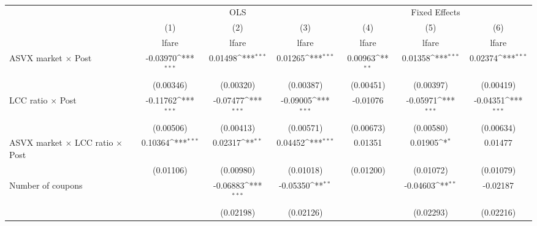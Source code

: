 \begin{table}[htbp]\centering
\def\sym#1{\ifmmode^{#1}\else\(^{#1}\)\fi}
\caption{ \label{post4fare}}
\begin{tabular}{l*{6}{c}}
\toprule
                    &\multicolumn{3}{c}{OLS}                                          &\multicolumn{3}{c}{Fixed Effects}                                \\\cmidrule(lr){2-4}\cmidrule(lr){5-7}
                    &\multicolumn{1}{c}{(1)}&\multicolumn{1}{c}{(2)}&\multicolumn{1}{c}{(3)}&\multicolumn{1}{c}{(4)}&\multicolumn{1}{c}{(5)}&\multicolumn{1}{c}{(6)}\\
                    &\multicolumn{1}{c}{lfare}&\multicolumn{1}{c}{lfare}&\multicolumn{1}{c}{lfare}&\multicolumn{1}{c}{lfare}&\multicolumn{1}{c}{lfare}&\multicolumn{1}{c}{lfare}\\
\midrule
ASVX market $\times$ Post&    -0.03970\sym{***}&     0.01498\sym{***}&     0.01265\sym{***}&     0.00963\sym{**} &     0.01358\sym{***}&     0.02374\sym{***}\\
                    &   (0.00346)         &   (0.00320)         &   (0.00387)         &   (0.00451)         &   (0.00397)         &   (0.00419)         \\
\addlinespace
LCC ratio $\times$ Post&    -0.11762\sym{***}&    -0.07477\sym{***}&    -0.09005\sym{***}&    -0.01076         &    -0.05971\sym{***}&    -0.04351\sym{***}\\
                    &   (0.00506)         &   (0.00413)         &   (0.00571)         &   (0.00673)         &   (0.00580)         &   (0.00634)         \\
\addlinespace
ASVX market $\times$ LCC ratio $\times$ Post&     0.10364\sym{***}&     0.02317\sym{**} &     0.04452\sym{***}&     0.01351         &     0.01905\sym{*}  &     0.01477         \\
                    &   (0.01106)         &   (0.00980)         &   (0.01018)         &   (0.01200)         &   (0.01072)         &   (0.01079)         \\
\addlinespace
Number of coupons   &                     &    -0.06883\sym{***}&    -0.05350\sym{**} &                     &    -0.04603\sym{**} &    -0.02187         \\
                    &                     &   (0.02198)         &   (0.02126)         &                     &   (0.02293)         &   (0.02216)         \\

\end{tabular}
\end{table}
